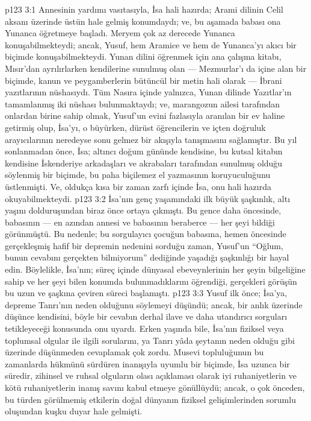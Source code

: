 \vs p123 3:1 Annesinin yardımı vasıtasıyla, İsa hali hazırda; Arami dilinin Celil aksanı üzerinde üstün hale gelmiş konumdaydı; ve, bu aşamada babası ona Yunanca öğretmeye başladı. Meryem çok az derecede Yunanca konuşabilmekteydi; ancak, Yusuf, hem Aramice ve hem de Yunanca’yı akıcı bir biçimde konuşabilmekteydi. Yunan dilini öğrenmek için ana çalışma kitabı, Mısır’dan ayrılırlarken kendilerine sunulmuş olan --- Mezmurlar’ı da içine alan bir biçimde, kanun ve peygamberlerin bütüncül bir metin hali olarak --- İbrani yazıtlarının nüshasıydı. Tüm Nasıra içinde yalnızca, Yunan dilinde Yazıtlar’ın tamamlanmış iki nüshası bulunmaktaydı; ve, marangozun ailesi tarafından onlardan birine sahip olmak, Yusuf’un evini fazlasıyla aranılan bir ev haline getirmiş olup, İsa’yı, o büyürken, dürüst öğrencilerin ve içten doğruluk arayıcılarının neredeyse sonu gelmez bir akışıyla tanışmasını sağlamıştır. Bu yıl sonlanmadan önce, İsa; altıncı doğum gününde kendisine, bu kutsal kitabın kendisine İskenderiye arkadaşları ve akrabaları tarafından sunulmuş olduğu söylenmiş bir biçimde, bu paha biçilemez el yazmasının koruyuculuğunu üstlenmişti. Ve, oldukça kısa bir zaman zarfı içinde İsa, onu hali hazırda okuyabilmekteydi.
\vs p123 3:2 İsa’nın genç yaşamındaki ilk büyük şaşkınlık, altı yaşını dolduruşundan biraz önce ortaya çıkmıştı. Bu gence daha öncesinde, babasının --- en azından annesi ve babasının beraberce --- her şeyi bildiği görünmüştü. Bu nedenle; bu sorgulayıcı çocuğun babasına, hemen öncesinde gerçekleşmiş hafif bir depremin nedenini sorduğu zaman, Yusuf’un “Oğlum, bunun cevabını gerçekten bilmiyorum” dediğinde yaşadığı şaşkınlığı bir hayal edin. Böylelikle, İsa’nın; süreç içinde dünyasal ebeveynlerinin her şeyin bilgeliğine sahip ve her şeyi bilen konumda bulunmadıklarını öğrendiği, gerçekleri görüşün bu uzun ve şaşkına çeviren süreci başlamıştı.
\vs p123 3:3 Yusuf ilk önce; İsa’ya, depreme Tanrı’nın neden olduğunu söylemeyi düşündü; ancak, bir anlık üzerinde düşünce kendisini, böyle bir cevabın derhal ilave ve daha utandırıcı sorguları tetikleyeceği konusunda onu uyardı. Erken yaşında bile, İsa’nın fiziksel veya toplumsal olgular ile ilgili sorularını, ya Tanrı yâda şeytanın neden olduğu gibi üzerinde düşünmeden cevaplamak çok zordu. Musevi topluluğunun bu zamanlarda hükmünü sürdüren inanışıyla uyumlu bir biçimde, İsa uzunca bir süredir, zihinsel ve ruhsal olguların olası açıklaması olarak iyi ruhaniyetlerin ve kötü ruhaniyetlerin inanış savını kabul etmeye gönüllüydü; ancak, o çok önceden, bu türden görülmemiş etkilerin doğal dünyanın fiziksel gelişimlerinden sorumlu oluşundan kuşku duyar hale gelmişti.
